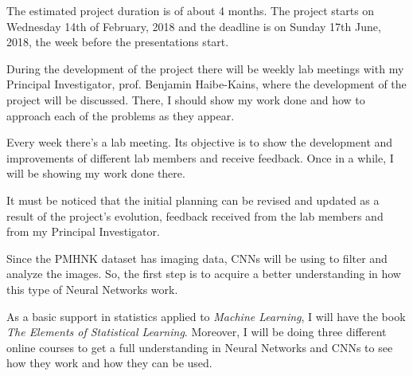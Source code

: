 


The estimated project duration is of about 4 months. The project starts on Wednesday 14th of 
February, 2018 and the deadline is on Sunday 17th June, 2018, the week before the 
presentations start.

During the development of the project there will be weekly lab meetings with my Principal
Investigator, prof. Benjamin Haibe-Kains, where the development of the project will be 
discussed. There, I should show my work done and how to approach each of the problems as
they appear.

Every week there's a lab meeting. Its objective is to show the development and improvements 
of different lab members and receive feedback. Once in a while, I will be showing my work
done there.

It must be noticed that the initial planning can be revised and updated as a result of the 
project's evolution, feedback received from the lab members and from my Principal Investigator. 



Since the \gls{PMHNK} dataset has imaging data, \glspl{CNN} will be using to filter and analyze
the images. So, the first step is to acquire a better understanding in how this type of Neural
Networks work.

As a basic support in statistics applied to \emph{Machine Learning}, I will have the book 
\emph{The Elements of Statistical Learning}. Moreover, I will be doing three different online 
courses to get a full understanding in Neural Networks and \glspl{CNN} to see how they work
and how they can be used. 
~\cite{neural:elements-statistical-learning}

